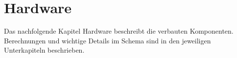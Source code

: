 \section{Hardware}
\label{sec:Hardware}

Das nachfolgende Kapitel Hardware beschreibt die verbauten Komponenten.
Berechnungen und wichtige Details im Schema sind in den jeweiligen Unterkapiteln beschrieben.


